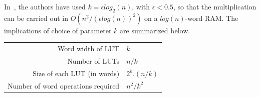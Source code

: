 \documentclass[conference, 9pt]{IEEEtran}
\begin{document}
In~\cite{williams2007matrix}, the authors have used $k = \epsilon log_2(n)$, with $\epsilon < 0.5$,
so that the multiplication can be carried out in $O(n^2/(\epsilon log(n))^2)$ on a $log(n)$-word
 RAM. The implications of choice of parameter $k$ are summarized below.
\begin{center}
 \begin{tabular}{|r|l|}
 \hline
Word width of LUT & $k$ \\
Number of LUTs & $n/k$ \\
Size of each LUT (in words) & $2^k.(n/k)$ \\
Number of word operations required & $n^2/k^2$ \\  
\hline
 \end{tabular}
\end{center} 
% 
% 
\end{document}

